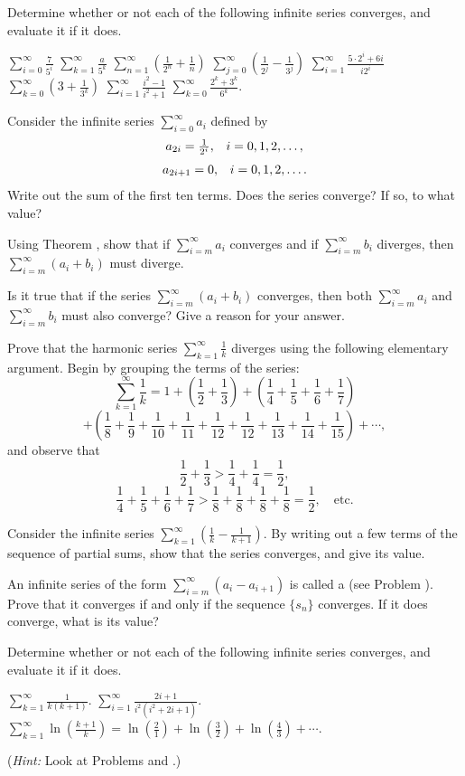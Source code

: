 \begin{exercises}

Determine whether or not each of the following
infinite series converges, and evaluate it if it does.
\begin{exenum}
\x
$\sum_{i=0}^\infty \frac7{5^i}$
\x
$\sum_{k=1}^\infty \frac{a}{5^k}$
\x
$\sum_{n=1}^\infty \left( \frac1{2^n} + \frac1n \right)$
\x
$\sum_{j=0}^\infty \left(\frac1{2^j} - \frac1{3^j}\right)$
\x
$\sum_{i=1}^\infty \frac{5\cdot2^i+6i}{i2^i}$
\x
$\sum_{k=0}^\infty \left(3+\frac1{3^k}\right)$
\x
$\sum_{i=1}^\infty \frac{i^2-1}{i^2+1}$
\x
$\sum_{k=0}^\infty \frac{2^k+3^k}{6^k}$.
\end{exenum}

Consider the infinite series
$\sum_{i=0}^\infty a_i$ defined by
\[
\begin{array}{ll} a_{2i} = \frac1{2^i}, & i = 0, 1, 2, \ldots , \end{array}
\]
\[
\begin{array}{ll} a_{2i+1} = 0, & i = 0, 1, 2, \ldots . \end{array}
\]
Write out the sum of the first ten terms.
Does the series converge?
If so, to what value?

Using Theorem , show that if
$\sum_{i=m}^\infty a_i$ converges and if
$\sum_{i=m}^\infty b_i$ diverges, then
$\sum_{i=m}^\infty (a_i+b_i)$ must diverge.

Is it true that if the series
$\sum_{i=m}^\infty (a_i+b_i)$ converges, then both
$\sum_{i=m}^\infty a_i$ and
$\sum_{i=m}^\infty b_i$ must also converge?
Give a reason for your answer.

Prove that the harmonic series
$\sum_{k=1}^\infty \frac1k$ diverges using
the following elementary argument.
Begin by grouping the terms of the series:
\[
\sum_{k=1}^\infty \frac1k =
1 + \left(\frac12+\frac13\right) + 
\left(\frac14+\frac15+\frac16+\frac17\right)
\]
\[
+ \left(\frac18+\frac19+\frac1{10}+\frac1{11}+\frac1{12}+
\frac1{12}+\frac1{13}+\frac1{14}+\frac1{15}\right) + \cdots
,
\]
and observe that
\[
\frac12 + \frac13 > \frac14 + \frac14 = \frac12
,
\]
\[
\frac14+\frac15+\frac16+\frac17>
\frac18+\frac18+\frac18+\frac18=\frac12,
\quad \mbox{etc.}
\]

Consider the infinite series
$\sum_{k=1}^\infty \left(\frac1k - \frac1{k+1}\right)$.
By writing out a few terms of the sequence
of partial sums, show that the series converges,
and give its value.

An infinite series of the form
$\sum_{i=m}^\infty (a_i - a_{i+1})$
is called a 
(see Problem ).
Prove that it converges if and only if the sequence
$\{ s_n \}$ converges.
If it does converge, what is its value?

Determine whether or not each of the following infinite
series converges, and evaluate it if it does.
\begin{exenum}
\x
$\sum_{k=1}^\infty \frac1{k(k+1)}$.
\x
$\sum_{i=1}^\infty \frac{2i+1}{i^2(i^2+2i+1)}$.
\x
$\sum_{k=1}^\infty \ln \left(\frac{k+1}k\right) =
\ln \left(\frac21\right) + \ln \left(\frac32\right) +
\ln \left(\frac43\right) + \cdots $.
\end{exenum}
(\emph{Hint:} Look at Problems
 and .)

\end{exercises}
